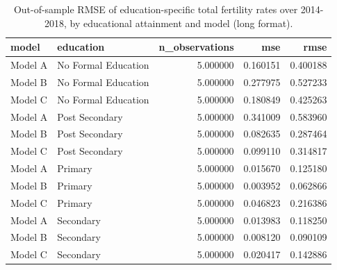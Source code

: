\begin{table}[ht]
\centering
\begin{tabular}{llrrr}
\hline
model & education & n_observations & mse & rmse \\
\hline
Model A & No Formal Education & 5.000000 & 0.160151 & 0.400188 \\
Model B & No Formal Education & 5.000000 & 0.277975 & 0.527233 \\
Model C & No Formal Education & 5.000000 & 0.180849 & 0.425263 \\
Model A & Post Secondary & 5.000000 & 0.341009 & 0.583960 \\
Model B & Post Secondary & 5.000000 & 0.082635 & 0.287464 \\
Model C & Post Secondary & 5.000000 & 0.099110 & 0.314817 \\
Model A & Primary & 5.000000 & 0.015670 & 0.125180 \\
Model B & Primary & 5.000000 & 0.003952 & 0.062866 \\
Model C & Primary & 5.000000 & 0.046823 & 0.216386 \\
Model A & Secondary & 5.000000 & 0.013983 & 0.118250 \\
Model B & Secondary & 5.000000 & 0.008120 & 0.090109 \\
Model C & Secondary & 5.000000 & 0.020417 & 0.142886 \\
\hline
\end{tabular}
\caption{Out-of-sample RMSE of education-specific total fertility rates over 2014-2018, by educational attainment and model (long format).}
\label{tab:new_table_e9_long}
\end{table}
